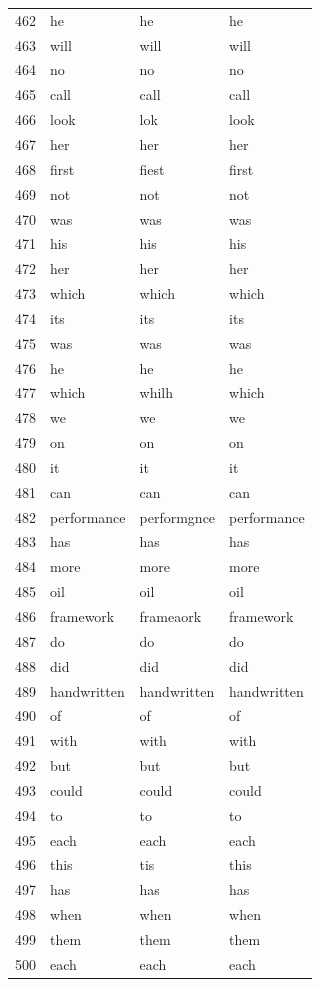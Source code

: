 \begin{longtable}{clll}
    462 & he & he & he \\
    463 & will & will & will \\
    464 & no & no & no \\
    465 & call & call & call \\
    466 & look & lok & look \\
    467 & her & her & her \\
    468 & first & fiest & first \\
    469 & not & not & not \\
    470 & was & was & was \\
    471 & his & his & his \\
    472 & her & her & her \\
    473 & which & which & which \\
    474 & its & its & its \\
    475 & was & was & was \\
    476 & he & he & he \\
    477 & which & whilh & which \\
    478 & we & we & we \\
    479 & on & on & on \\
    480 & it & it & it \\
    481 & can & can & can \\
    482 & performance & performgnce & performance \\
    483 & has & has & has \\
    484 & more & more & more \\
    485 & oil & oil & oil \\
    486 & framework & frameaork & framework \\
    487 & do & do & do \\
    488 & did & did & did \\
    489 & handwritten & handwritten & handwritten \\
    490 & of & of & of \\
    491 & with & with & with \\
    492 & but & but & but \\
    493 & could & could & could \\
    494 & to & to & to \\
    495 & each & each & each \\
    496 & this & tis & this \\
    497 & has & has & has \\
    498 & when & when & when \\
    499 & them & them & them \\
    500 & each & each & each \\
\end{longtable}
